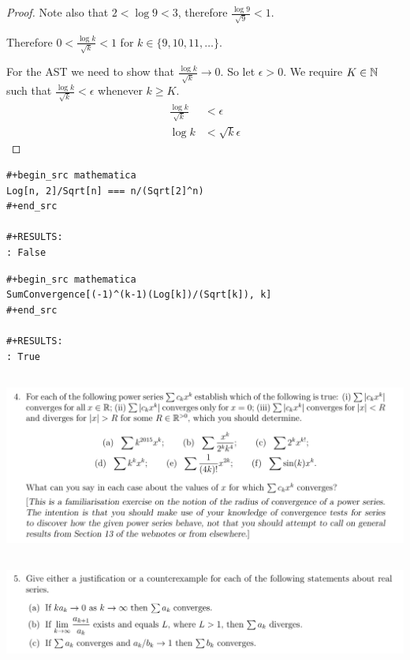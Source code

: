 \documentclass[12pt]{article}
\begin{document}
\begin{enumerate}[label=(\alph*)]
\begin{proof}
    Note also that $2 < \log 9 < 3$, therefore $\frac{\log 9}{\sqrt{9}} < 1$.

    Therefore $0 < \frac{\log k}{\sqrt{k}} < 1$ for $k \in \{9, 10, 11, \ldots\}$.

    For the AST we need to show that $\frac{\log k}{\sqrt{k}} \to 0$. So let $\epsilon > 0$. We
    require $K \in \mathbb{N}$ such that $\frac{\log k}{\sqrt{k}} < \epsilon$ whenever $k \geq K$.
    \begin{align*}
      \frac{\log k}{\sqrt{k}} &< \epsilon \\
      \log k &< \sqrt{k}\epsilon
    \end{align*}


  \end{proof}

\begin{verbatim}
#+begin_src mathematica
Log[n, 2]/Sqrt[n] === n/(Sqrt[2]^n)
#+end_src

#+RESULTS:
: False

\end{verbatim}


\begin{verbatim}
#+begin_src mathematica
SumConvergence[(-1)^(k-1)(Log[k])/(Sqrt[k]), k]
#+end_src

#+RESULTS:
: True

\end{verbatim}

\end{enumerate}

\newpage
\subsection{}
\begin{mdframed}
\includegraphics[width=400pt]{img/analysis--oxford-M2-I-6-4.png}
\end{mdframed}

\newpage
\subsection{}
\begin{mdframed}
\includegraphics[width=400pt]{img/analysis--oxford-M2-I-6-5.png}
\end{mdframed}
\end{document}
